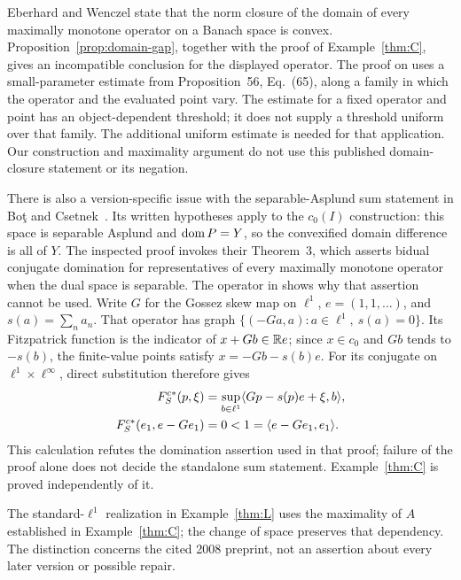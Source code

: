 Eberhard and Wenczel \cite[Theorem~57]{eberhardwenczel2024} state that
the norm closure of the domain of every maximally monotone operator on
a Banach space is convex. Proposition~\ref{prop:domain-gap}, together
with the proof of Example~\ref{thm:C}, gives an incompatible
conclusion for the displayed operator. The proof on
\cite[pp.~39--40]{eberhardwenczel2024} uses a small-parameter estimate
from Proposition~56, Eq.~(65), along a family in which the operator and
the evaluated point vary. The estimate for a fixed operator and point
has an object-dependent threshold; it does not supply a threshold
uniform over that family. The additional uniform estimate is needed
for that application. Our construction and maximality argument do not
use this published domain-closure statement or its negation.

There is also a version-specific issue with the separable-Asplund sum
statement in Bo\c{t} and Csetnek~\cite[Corollary~11]{botcsetnek2008}.
Its written hypotheses apply to the $c_0(I)$ construction: this space
is separable Asplund and $\operatorname{dom} P=Y$, so the convexified domain difference
is all of $Y$. The inspected proof invokes their Theorem~3, which asserts
bidual conjugate domination for representatives of every maximally
monotone operator when the dual space is separable. The operator in
\cite[author version, Lemma~2.1]{buenosvaiter2011} shows why that assertion cannot be used.
Write $G$ for the Gossez skew map on $\ell^1$, $e=(1,1,\ldots)$, and
$s(a)=\sum_n a_n$. That operator has graph
$\{(-Ga,a):a\in\ell^1,\ s(a)=0\}$. Its Fitzpatrick function is the
indicator of $x+Gb\in\mathbb R e$; since $x\in c_0$ and $Gb$ tends to $-s(b)$,
the finite-value points satisfy $x=-Gb-s(b)e$. For its conjugate on
$\ell^1\times\ell^\infty$, direct substitution therefore gives
\begin{equation}
\begin{aligned}
F_S^{c*}(p,\xi)
 &=\sup_{b\in\ell^1}\langle Gp-s(p)e+\xi,b\rangle,\\
F_S^{c*}(e_1,e-Ge_1)&=0<1=\langle e-Ge_1,e_1\rangle.
\end{aligned}
\label{eq:bidual-interface}
\end{equation}
This calculation refutes the domination assertion used in that proof;
failure of the proof alone does not decide the standalone sum statement.
Example~\ref{thm:C} is proved independently of it.

The standard-$\ell^1$ realization in Example~\ref{thm:L} uses
the maximality of $A$ established in Example~\ref{thm:C}; the change
of space preserves that dependency. The distinction concerns the cited
2008 preprint, not an assertion about every later version or possible repair.


